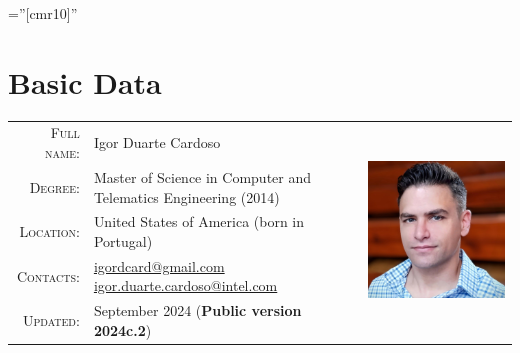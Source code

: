 \documentclass[letter,10pt]{article} %
\begin{document}
\hypersetup{colorlinks,breaklinks,urlcolor=linkcolour,linkcolor=linkcolour} %

\pagestyle{empty} %

\font\fb=''[cmr10]'' %



\par{\bigskip\par} %

\section{Basic Data}

\begin{tabular}{rlr}
\textsc{Full name:} & Igor Duarte Cardoso & \multirow{7}{*}{\includegraphics[scale=0.8]{2024avatar-400px.jpg}} \\
\textsc{Degree:} & Master of Science in Computer and Telematics Engineering (2014) & \\
\textsc{Location:} & United States of America (born in Portugal) & \\
\textsc{Contacts:} & \href{mailto:igordcard+cv@gmail.com}{igordcard@gmail.com}  \href{mailto:igor.duarte.cardoso@intel.com}{igor.duarte.cardoso@intel.com} & \\
\textsc{Updated:} & September 2024 (\textbf{Public version 2024c.2}) & \\
\end{tabular} \\
\end{document}
